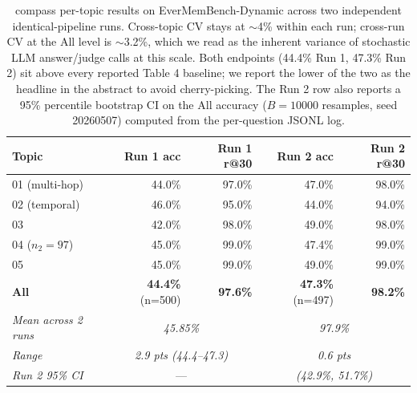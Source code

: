 \begin{table}[h]
\centering
\begin{tabular}{lrrrr}
\toprule
Topic & Run 1 acc & Run 1 r@30 & Run 2 acc & Run 2 r@30 \\
\midrule
01 (multi-hop)        & 44.0\% & 97.0\% & 47.0\% & 98.0\% \\
02 (temporal)         & 46.0\% & 95.0\% & 44.0\% & 94.0\% \\
03                    & 42.0\% & 98.0\% & 49.0\% & 98.0\% \\
04 ($n_{2}=97$)       & 45.0\% & 99.0\% & 47.4\% & 99.0\% \\
05                    & 45.0\% & 99.0\% & 49.0\% & 99.0\% \\
\midrule
\textbf{All}          & \textbf{44.4\%} (n=500) & \textbf{97.6\%} & \textbf{47.3\%} (n=497) & \textbf{98.2\%} \\
\midrule
\textit{Mean across 2 runs} & \multicolumn{2}{c}{\textit{45.85\%}} & \multicolumn{2}{c}{\textit{97.9\%}} \\
\textit{Range}              & \multicolumn{2}{c}{\textit{2.9 pts (44.4--47.3)}} & \multicolumn{2}{c}{\textit{0.6 pts}} \\
\textit{Run 2 95\% CI}      & \multicolumn{2}{c}{---} & \multicolumn{2}{c}{\textit{(42.9\%, 51.7\%)}} \\
\bottomrule
\end{tabular}
\caption{compass per-topic results on EverMemBench-Dynamic across two
independent identical-pipeline runs. Cross-topic CV stays at $\sim$4\%
within each run; cross-run CV at the All level is $\sim$3.2\%, which we
read as the inherent variance of stochastic LLM answer/judge calls at
this scale. Both endpoints (44.4\% Run 1, 47.3\% Run 2) sit above every
reported Table 4 baseline; we report the lower of the two as the headline
in the abstract to avoid cherry-picking. The Run 2 row also reports a
95\% percentile bootstrap CI on the All accuracy ($B{=}10000$ resamples,
seed 20260507) computed from the per-question JSONL log.}
\label{tab:em-per-topic}
\end{table}



